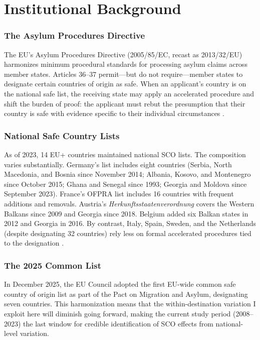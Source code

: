 \documentclass[12pt]{article}
\begin{document}
\section{Institutional Background}

\subsubsection*{The Asylum Procedures Directive} The EU's Asylum Procedures Directive (2005/85/EC, recast as 2013/32/EU) harmonizes minimum procedural standards for processing asylum claims across member states. Articles 36--37 permit---but do not require---member states to designate certain countries of origin as safe. When an applicant's country is on the national safe list, the receiving state may apply an accelerated procedure and shift the burden of proof: the applicant must rebut the presumption that their country is safe with evidence specific to their individual circumstances \citep{euaa2023guidance}.

\subsubsection*{National Safe Country Lists} As of 2023, 14 EU+ countries maintained national SCO lists. The composition varies substantially. Germany's list includes eight countries (Serbia, North Macedonia, and Bosnia since November 2014; Albania, Kosovo, and Montenegro since October 2015; Ghana and Senegal since 1993; Georgia and Moldova since September 2023). France's OFPRA list includes 16 countries with frequent additions and removals. Austria's \textit{Herkunftsstaatenverordnung} covers the Western Balkans since 2009 and Georgia since 2018. Belgium added six Balkan states in 2012 and Georgia in 2016. By contrast, Italy, Spain, Sweden, and the Netherlands (despite designating 32 countries) rely less on formal accelerated procedures tied to the designation \citep{aida2023country}.

\subsubsection*{The 2025 Common List} In December 2025, the EU Council adopted the first EU-wide common safe country of origin list as part of the Pact on Migration and Asylum, designating seven countries. This harmonization means that the within-destination variation I exploit here will diminish going forward, making the current study period (2008--2023) the last window for credible identification of SCO effects from national-level variation.
\end{document}
